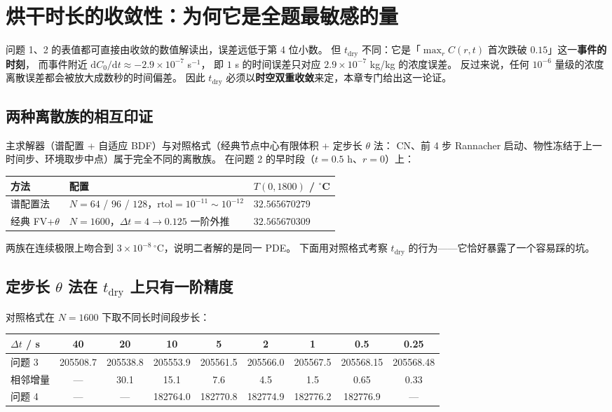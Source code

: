 \documentclass[11pt,a4paper]{article}
\theoremstyle{definition}
\begin{document}
\section{烘干时长的收敛性：为何它是全题最敏感的量}

问题 1、2 的表值都可直接由收敛的数值解读出，误差远低于第 4 位小数。
但 $t_{\text{dry}}$ 不同：它是「$\max_r C(r,t)$ 首次跌破 $0.15$」这一\textbf{事件的时刻}，
而事件附近 $\mathrm{d}C_0/\mathrm{d}t\approx-2.9\times10^{-7}$ s$^{-1}$，
即 $1$ s 的时间误差只对应 $2.9\times10^{-7}$ kg/kg 的浓度误差。
反过来说，任何 $10^{-6}$ 量级的浓度离散误差都会被放大成数秒的时间偏差。
因此 $t_{\text{dry}}$ 必须以\textbf{时空双重收敛}来定，本章专门给出这一论证。

\subsection{两种离散族的相互印证}

主求解器（谱配置 + 自适应 BDF）与对照格式（经典节点中心有限体积 + 定步长 $\theta$ 法：
CN、前 4 步 Rannacher 启动、物性冻结于上一时间步、环境取步中点）属于完全不同的离散族。
在问题 2 的早时段（$t=0.5$ h、$r=0$）上：

\begin{center}
\small
\begin{tabular}{@{}lll@{}}
\toprule
方法 & 配置 & $T(0,1800)$ / $^\circ$C \\
\midrule
谱配置法 & $N=64$ / $96$ / $128$，$\mathrm{rtol}=10^{-11}\!\sim\!10^{-12}$ & $32.565670279$ \\
经典 FV+$\theta$ & $N=1600$，$\Delta t=4\to0.125$ 一阶外推 & $32.565670309$ \\
\bottomrule
\end{tabular}
\end{center}

两族在连续极限上吻合到 $3\times10^{-8}\,^\circ$C，说明二者解的是同一 PDE。
下面用对照格式考察 $t_{\text{dry}}$ 的行为——它恰好暴露了一个容易踩的坑。

\subsection{定步长 $\theta$ 法在 $t_{\text{dry}}$ 上只有一阶精度}

对照格式在 $N=1600$ 下取不同长时间段步长：

\begin{center}
\small
\begin{tabular}{@{}lcccccccc@{}}
\toprule
$\Delta t$ / s & 40 & 20 & 10 & 5 & 2 & 1 & 0.5 & 0.25 \\
\midrule
问题 3 & 205508.7 & 205538.8 & 205553.9 & 205561.5 & 205566.0 & 205567.5 & 205568.15 & 205568.48 \\
相邻增量 & --- & 30.1 & 15.1 & 7.6 & 4.5 & 1.5 & 0.65 & 0.33 \\
\midrule
问题 4 & --- & --- & 182764.0 & 182770.8 & 182774.9 & 182776.2 & 182776.9 & --- \\
\bottomrule
\end{tabular}
\end{center}
\end{document}
